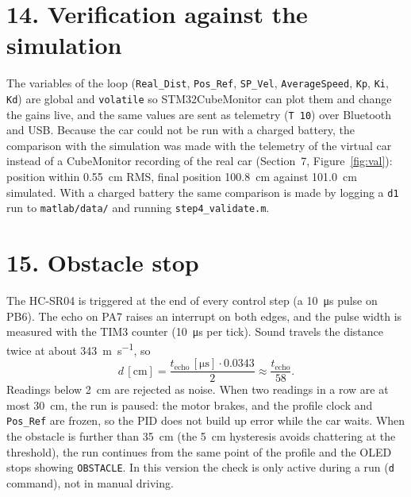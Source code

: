 \documentclass[letterpaper, 11pt]{article}
\begin{document}
\section*{14. Verification against the simulation}

The variables of the loop (\texttt{Real\_Dist}, \texttt{Pos\_Ref}, \texttt{SP\_Vel},
\texttt{AverageSpeed}, \texttt{Kp}, \texttt{Ki}, \texttt{Kd}) are global and
\texttt{volatile} so STM32CubeMonitor can plot them and change the gains live, and
the same values are sent as telemetry (\texttt{T 10}) over Bluetooth and USB.
Because the car could not be run with a charged battery, the comparison with the
simulation was made with the telemetry of the virtual car instead of a CubeMonitor recording of
the real car (Section~7, Figure~\ref{fig:val}): position within
\SI{0.55}{\centi\meter} RMS, final position \SI{100.8}{\centi\meter} against
\SI{101.0}{\centi\meter} simulated. With a charged battery the same comparison is made
by logging a \texttt{d1} run to \texttt{matlab/data/} and running
\texttt{step4\_validate.m}.

\section*{15. Obstacle stop}

The HC-SR04 is triggered at the end of every control step (a \SI{10}{\micro\second}
pulse on PB6). The echo on PA7 raises an interrupt on both edges, and the pulse
width is measured with the TIM3 counter (\SI{10}{\micro\second} per tick).
Sound travels the distance twice at about \SI{343}{\meter\per\second}, so
\[
  d\,[\si{\centi\meter}] = \frac{t_\text{echo}\,[\si{\micro\second}] \cdot 0.0343}{2}
  \approx \frac{t_\text{echo}}{58}.
\]
Readings below \SI{2}{\centi\meter} are rejected as noise. When two readings in a row
are at most \SI{30}{\centi\meter}, the run is paused: the motor brakes, and the
profile clock and \texttt{Pos\_Ref} are frozen, so the PID does not build up error
while the car waits. When the obstacle is further than \SI{35}{\centi\meter} (the
\SI{5}{\centi\meter} hysteresis avoids chattering at the threshold), the run
continues from the same point of the profile and the OLED stops showing
\texttt{OBSTACLE}. In this version the check is only active during a run
(\texttt{d} command), not in manual driving.

\end{document}
